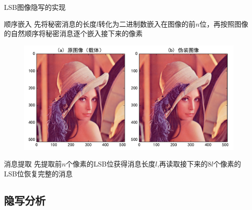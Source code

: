 \documentclass[14pt]{Bredelebeamer}
\begin{document}
\begin{frame}{LSB图像隐写的实现}
  \begin{block}{顺序嵌入}
    先将秘密消息的长度$l$转化为二进制数嵌入在图像的前$n$位，再按照图像的自然顺序将秘密消息逐个嵌入接下来的像素
  \end{block}
  \begin{figure}
    \centering
    \includegraphics[width=.7\textwidth]{images/gettys}
  \end{figure}
  \begin{exampleblock}{消息提取}
    先提取前$n$个像素的LSB位获得消息长度$l$,再读取接下来的$8l$个像素的LSB位恢复完整的消息
  \end{exampleblock}
\end{frame}

\subsection{隐写分析}
\end{document}

